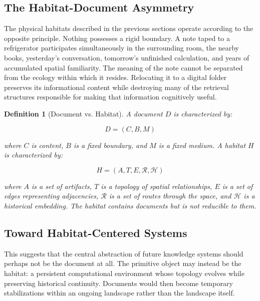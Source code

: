 \documentclass[12pt,oneside]{article}
\newtheorem{definition}{Definition}[section]
\theoremstyle{remark}
\begin{document}
\subsection{The Habitat-Document Asymmetry}

The physical habitats described in the previous sections operate according to the opposite principle. Nothing possesses a rigid boundary. A note taped to a refrigerator participates simultaneously in the surrounding room, the nearby books, yesterday's conversation, tomorrow's unfinished calculation, and years of accumulated spatial familiarity. The meaning of the note cannot be separated from the ecology within which it resides. Relocating it to a digital folder preserves its informational content while destroying many of the retrieval structures responsible for making that information cognitively useful.

\begin{definition}[Document vs. Habitat]
A document $D$ is characterized by:

\begin{equation}
D = (C, B, M)
\end{equation}

where $C$ is content, $B$ is a fixed boundary, and $M$ is a fixed medium. A habitat $H$ is characterized by:

\begin{equation}
H = (A, T, E, \mathcal{R}, \mathcal{H})
\end{equation}

where $A$ is a set of artifacts, $T$ is a topology of spatial relationships, $E$ is a set of edges representing adjacencies, $\mathcal{R}$ is a set of routes through the space, and $\mathcal{H}$ is a historical embedding. The habitat contains documents but is not reducible to them.
\end{definition}

\subsection{Toward Habitat-Centered Systems}

This suggests that the central abstraction of future knowledge systems should perhaps not be the document at all. The primitive object may instead be the habitat: a persistent computational environment whose topology evolves while preserving historical continuity. Documents would then become temporary stabilizations within an ongoing landscape rather than the landscape itself.
\end{document}
